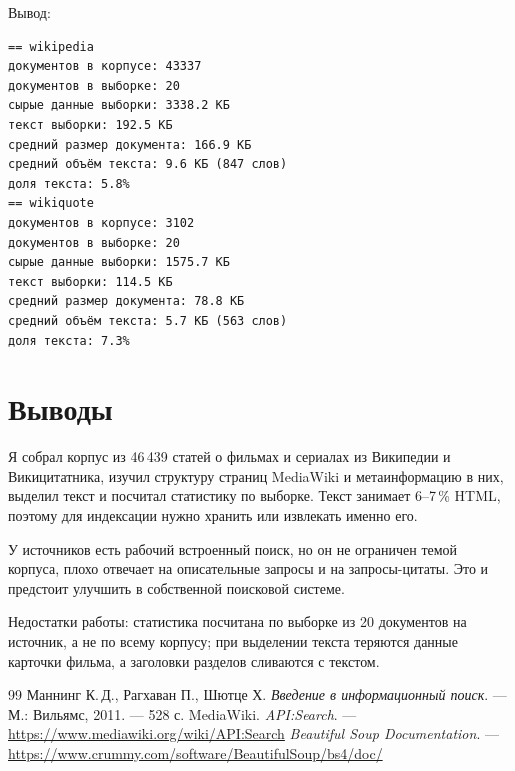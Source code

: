 \documentclass[12pt,a4paper,oneside,fleqn]{article}
\begin{document}
Вывод:

\begin{lstlisting}[style=plaintext]
== wikipedia
документов в корпусе: 43337
документов в выборке: 20
сырые данные выборки: 3338.2 КБ
текст выборки: 192.5 КБ
средний размер документа: 166.9 КБ
средний объём текста: 9.6 КБ (847 слов)
доля текста: 5.8%
== wikiquote
документов в корпусе: 3102
документов в выборке: 20
сырые данные выборки: 1575.7 КБ
текст выборки: 114.5 КБ
средний размер документа: 78.8 КБ
средний объём текста: 5.7 КБ (563 слов)
доля текста: 7.3%
\end{lstlisting}

\pagebreak

\section{Выводы}

Я собрал корпус из 46\,439 статей о фильмах и сериалах из Википедии и Викицитатника, изучил структуру страниц MediaWiki и метаинформацию в них, выделил текст и посчитал статистику по выборке. Текст занимает 6--7\,\% HTML, поэтому для индексации нужно хранить или извлекать именно его.

У источников есть рабочий встроенный поиск, но он не ограничен темой корпуса, плохо отвечает на описательные запросы и на запросы-цитаты. Это и предстоит улучшить в собственной поисковой системе.

Недостатки работы: статистика посчитана по выборке из 20 документов на источник, а не по всему корпусу; при выделении текста теряются данные карточки фильма, а заголовки разделов сливаются с текстом.

\pagebreak

\begin{thebibliography}{99}
Маннинг К.\,Д., Рагхаван П., Шютце Х. {\itshape Введение в информационный поиск}. --- М.: Вильямс, 2011. --- 528 с.
MediaWiki. {\itshape API:Search}. --- \url{https://www.mediawiki.org/wiki/API:Search}
{\itshape Beautiful Soup Documentation}. --- \url{https://www.crummy.com/software/BeautifulSoup/bs4/doc/}
\end{thebibliography}
\end{document}
